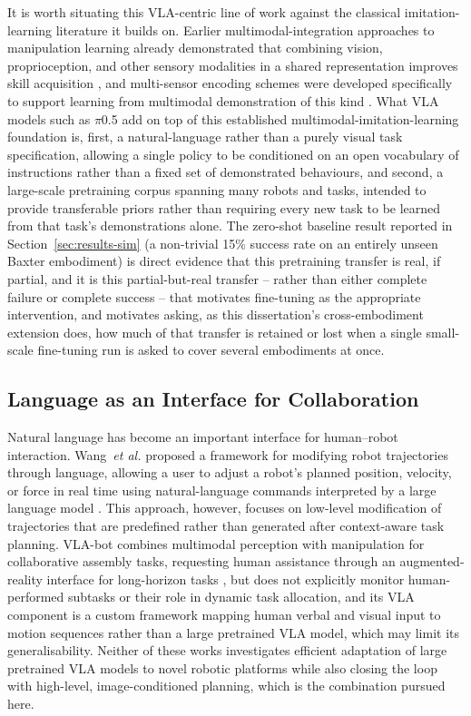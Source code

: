\documentclass[12pt]{article}
\begin{document}
It is worth situating this VLA-centric line of work against the classical imitation-learning literature it builds on. Earlier multimodal-integration approaches to manipulation learning already demonstrated that combining vision, proprioception, and other sensory modalities in a shared representation improves skill acquisition \cite{NODA2014721}, and multi-sensor encoding schemes were developed specifically to support learning from multimodal demonstration of this kind \cite{zeng2019encoding}. What VLA models such as $\pi$0.5 add on top of this established multimodal-imitation-learning foundation is, first, a natural-language rather than a purely visual task specification, allowing a single policy to be conditioned on an open vocabulary of instructions rather than a fixed set of demonstrated behaviours, and second, a large-scale pretraining corpus spanning many robots and tasks, intended to provide transferable priors rather than requiring every new task to be learned from that task's demonstrations alone. The zero-shot baseline result reported in Section~\ref{sec:results-sim} (a non-trivial 15\% success rate on an entirely unseen Baxter embodiment) is direct evidence that this pretraining transfer is real, if partial, and it is this partial-but-real transfer -- rather than either complete failure or complete success -- that motivates fine-tuning as the appropriate intervention, and motivates asking, as this dissertation's cross-embodiment extension does, how much of that transfer is retained or lost when a single small-scale fine-tuning run is asked to cover several embodiments at once.

\subsection{Language as an Interface for Collaboration}

Natural language has become an important interface for human--robot interaction. Wang~\emph{et al.} proposed a framework for modifying robot trajectories through language, allowing a user to adjust a robot's planned position, velocity, or force in real time using natural-language commands interpreted by a large language model \cite{wang2026bidirectionalhumanrobotcommunicationphysical}. This approach, however, focuses on low-level modification of trajectories that are predefined rather than generated after context-aware task planning. VLA-bot combines multimodal perception with manipulation for collaborative assembly tasks, requesting human assistance through an augmented-reality interface for long-horizon tasks \cite{WANG2026103268}, but does not explicitly monitor human-performed subtasks or their role in dynamic task allocation, and its VLA component is a custom framework mapping human verbal and visual input to motion sequences rather than a large pretrained VLA model, which may limit its generalisability. Neither of these works investigates efficient adaptation of large pretrained VLA models to novel robotic platforms while also closing the loop with high-level, image-conditioned planning, which is the combination pursued here.
\end{document}
